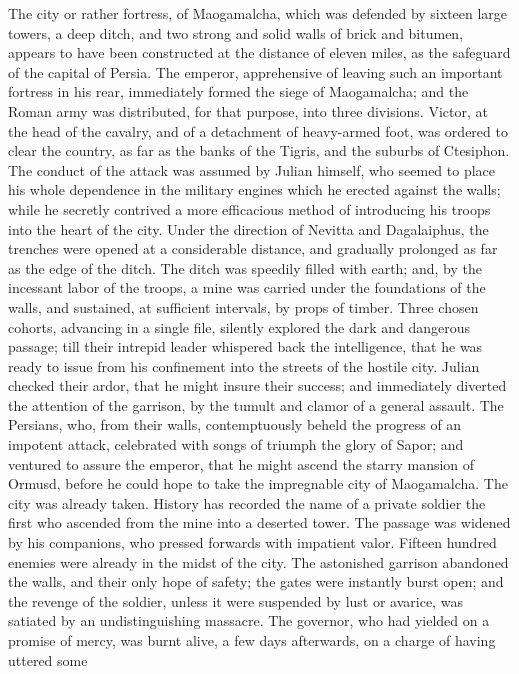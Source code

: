The city or rather fortress, of Maogamalcha, which was defended
by sixteen large towers, a deep ditch, and two strong and solid
walls of brick and bitumen, appears to have been constructed at
the distance of eleven miles, as the safeguard of the capital of
Persia. The emperor, apprehensive of leaving such an important
fortress in his rear, immediately formed the siege of
Maogamalcha; and the Roman army was distributed, for that
purpose, into three divisions. Victor, at the head of the
cavalry, and of a detachment of heavy-armed foot, was ordered to
clear the country, as far as the banks of the Tigris, and the
suburbs of Ctesiphon. The conduct of the attack was assumed by
Julian himself, who seemed to place his whole dependence in the
military engines which he erected against the walls; while he
secretly contrived a more efficacious method of introducing his
troops into the heart of the city. Under the direction of Nevitta
and Dagalaiphus, the trenches were opened at a considerable
distance, and gradually prolonged as far as the edge of the
ditch. The ditch was speedily filled with earth; and, by the
incessant labor of the troops, a mine was carried under the
foundations of the walls, and sustained, at sufficient intervals,
by props of timber. Three chosen cohorts, advancing in a single
file, silently explored the dark and dangerous passage; till
their intrepid leader whispered back the intelligence, that he
was ready to issue from his confinement into the streets of the
hostile city. Julian checked their ardor, that he might insure
their success; and immediately diverted the attention of the
garrison, by the tumult and clamor of a general assault. The
Persians, who, from their walls, contemptuously beheld the
progress of an impotent attack, celebrated with songs of triumph
the glory of Sapor; and ventured to assure the emperor, that he
might ascend the starry mansion of Ormusd, before he could hope
to take the impregnable city of Maogamalcha. The city was already
taken. History has recorded the name of a private soldier the
first who ascended from the mine into a deserted tower. The
passage was widened by his companions, who pressed forwards with
impatient valor. Fifteen hundred enemies were already in the
midst of the city. The astonished garrison abandoned the walls,
and their only hope of safety; the gates were instantly burst
open; and the revenge of the soldier, unless it were suspended by
lust or avarice, was satiated by an undistinguishing massacre.
The governor, who had yielded on a promise of mercy, was burnt
alive, a few days afterwards, on a charge of having uttered some

